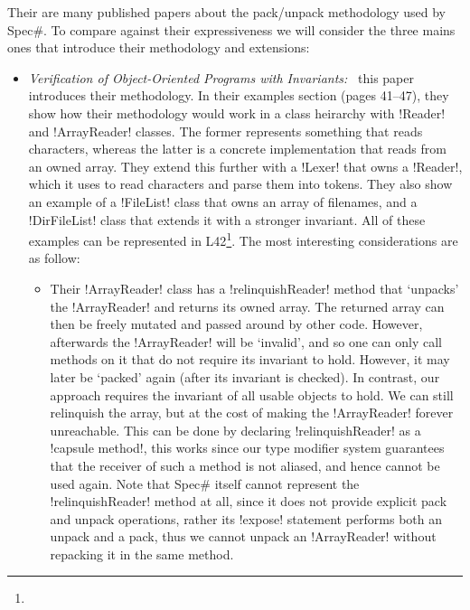 Their are many published papers about the pack/unpack methodology used by Spec\#. To compare against their expressiveness we will consider the three mains ones that introduce their methodology and extensions:
\begin{itemize}
	\item \emph{Verification of Object-Oriented Programs with Invariants:}~\cite{DBLP:journals/jot/BarnettDFLS04} this paper introduces their methodology. In their examples section (pages 41--47), they show how their methodology would work in a class heirarchy with  \Q!Reader! and \Q!ArrayReader! classes. The former represents something that reads characters, whereas the latter is a concrete implementation that reads from an owned array. They extend this further with a \Q!Lexer! that owns a \Q!Reader!, which it uses to read characters and parse them into tokens. They also show an example of a \Q!FileList! class that owns an array of filenames, and a \Q!DirFileList! class that extends it with a stronger invariant. All of these examples can be represented in L42\footnote{ }. The most interesting considerations are as follow:
	\begin{itemize}
		\item Their \Q!ArrayReader! class has a \Q!relinquishReader! method that `unpacks' the \Q!ArrayReader! and returns its owned array.
The returned array can then be freely mutated and passed around by other code.
However, afterwards the \Q!ArrayReader! will be `invalid', and so one can only call methods on it that do not require its invariant to hold. However, it may later be `packed' again (after its invariant is checked).
In contrast, our approach requires the invariant of all usable objects to hold.
We can still relinquish the array, but at the cost of making the \Q!ArrayReader! forever unreachable. This can be done by
 declaring \Q!relinquishReader! as a \Q!capsule method!, this works since our type modifier system guarantees that the receiver of such a method is not aliased, and hence cannot be used again. Note that Spec\# itself cannot represent the \Q!relinquishReader! method at all, since it does not provide explicit pack and unpack operations, rather its \Q!expose! statement performs both an unpack and a pack, thus we cannot unpack an \Q!ArrayReader! without repacking it in the same method.

\end{itemize}
\end{itemize}
